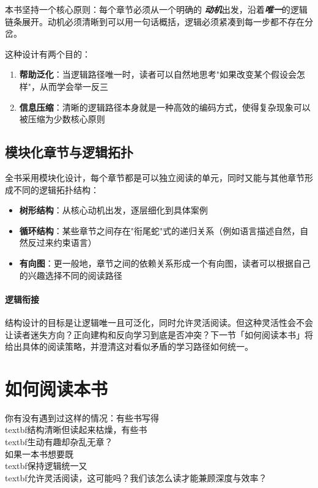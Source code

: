 \documentclass[../main.tex]{subfiles}
\begin{document}
本书坚持一个核心原则：每个章节必须从一个明确的
{\large \emph{\textbf{动机}}}出发，沿着{\large \emph{\textbf{唯一}}}的逻辑链条展开。动机必须清晰到可以用一句话概括，逻辑必须紧凑到每一步都不存在分岔。

	这种设计有两个目的：
	\begin{enumerate}
		\item \textbf{帮助泛化}：当逻辑路径唯一时，读者可以自然地思考"如果改变某个假设会怎样"，从而学会举一反三
		\item \textbf{信息压缩}：清晰的逻辑路径本身就是一种高效的编码方式，使得复杂现象可以被压缩为少数核心原则
	\end{enumerate}

	\subsection{模块化章节与逻辑拓扑}

全书采用模块化设计，每个章节都是可以独立阅读的单元，同时又能与其他章节形成不同的逻辑拓扑结构：
	\begin{itemize}
		\item \textbf{树形结构}：从核心动机出发，逐层细化到具体案例
		\item \textbf{循环结构}：某些章节之间存在"衔尾蛇"式的递归关系（例如语言描述自然，自然反过来约束语言）
		\item \textbf{有向图}：更一般地，章节之间的依赖关系形成一个有向图，读者可以根据自己的兴趣选择不同的阅读路径
	\end{itemize}

	\paragraph*{逻辑衔接}
	结构设计的目标是让逻辑唯一且可泛化，同时允许灵活阅读。但这种灵活性会不会让读者迷失方向？正向建构和反向学习到底是否冲突？下一节「如何阅读本书」将给出具体的阅读策略，并澄清这对看似矛盾的学习路径如何统一。

	\section{如何阅读本书}

	\begin{readingnote}
		你有没有遇到过这样的情况：有些书写得\\textbf{结构清晰}但读起来枯燥，有些书\\textbf{生动有趣}却杂乱无章？\\
		如果一本书想要既\\textbf{保持逻辑统一}又\\textbf{允许灵活阅读}，这可能吗？我们该怎么读才能兼顾深度与效率？
	\end{readingnote}
\end{document}
